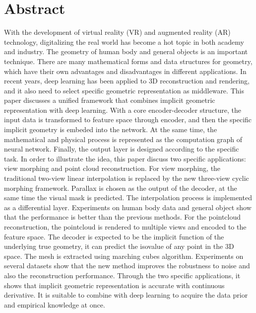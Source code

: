 \intobmk\chapter*{Abstract}%

With the development of virtual reality (VR) and augmented reality (AR) technology, digitalizing the real world has become a hot topic in both academy and industry. The geometry of human body and general objects is an important technique. There are many mathematical forms and data structures for geometry, which have their own advantages and disadvantages in different applications. In recent years, deep learning has been applied to 3D reconstruction and rendering, and it also need to select specific geometric representation as middleware. This paper discusses a unified framework that combines implicit geometric representation with deep learning. With a core encoder-decoder structure, the input data is transformed to feature space through encoder, and then the specific implicit geometry is embeded into the network. At the same time, the mathematical and physical process is represented as the computation graph of neural network. Finally, the output layer is designed according to the specific task. In order to illustrate the idea, this paper discuss two specific applications: view morphing and point cloud reconstruction. For view morphing, the traditional two-view linear interpolation is replaced by the new three-view cyclic morphing framework. Parallax is chosen as the output of the decoder, at the same time the visual mask is predicted. The interpolation process is implemented as a differential layer. Experiments on human body data and general object show that the performance is better than the previous methods. For the pointcloud reconstruction, the pointcloud is rendered to multiple views and encoded to the feature space. The decoder is expected to be the implicit function of the underlying true geometry, it can predict the isovalue of any point in the 3D space. The mesh is extracted using marching cubes algorithm. Experiments on several datasets show that the new method improves the robustness to noise and also the reconstruction performance. Through the two specific applications, it shows that implicit geometric representation is accurate with continuous derivative. It is suitable to combine with deep learning to acquire the data prior and empirical knowledge at once.

